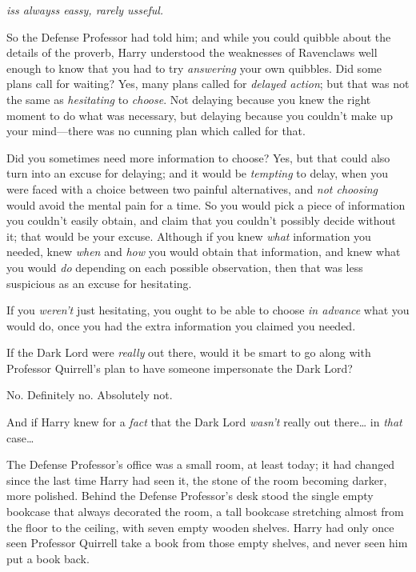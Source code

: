 
\emph{iss alwayss eassy, rarely usseful.}

\quad
So the Defense Professor had told him; and while you could quibble about the
details of the proverb, Harry understood the weaknesses of Ravenclaws well
enough to know that you had to try \emph{answering} your own quibbles. Did some
plans call for waiting? Yes, many plans called for \emph{delayed action}; but
that was not the same as \emph{hesitating} to \emph{choose}. Not delaying
because you knew the right moment to do what was necessary, but delaying
because you couldn't make up your mind---there was no cunning plan which called
for that.

Did you sometimes need more information to choose? Yes, but that could also
turn into an excuse for delaying; and it would be \emph{tempting} to delay,
when you were faced with a choice between two painful alternatives, and
\emph{not choosing} would avoid the mental pain for a time. So you would pick a
piece of information you couldn't easily obtain, and claim that you couldn't
possibly decide without it; that would be your excuse. Although if you knew
\emph{what} information you needed, knew \emph{when} and \emph{how} you would
obtain that information, and knew what you would \emph{do} depending on each
possible observation, then that was less suspicious as an excuse for hesitating.

If you \emph{weren't} just hesitating, you ought to be able to choose \emph{in
advance} what you would do, once you had the extra information you claimed you
needed.

If the Dark Lord were \emph{really} out there, would it be smart to go along
with Professor Quirrell's plan to have someone impersonate the Dark Lord?

No. Definitely no. Absolutely not.

And if Harry knew for a \emph{fact} that the Dark Lord \emph{wasn't} really out
there{\ldots} in \emph{that} case{\ldots}

The Defense Professor's office was a small room, at least today; it had changed
since the last time Harry had seen it, the stone of the room becoming darker,
more polished. Behind the Defense Professor's desk stood the single empty
bookcase that always decorated the room, a tall bookcase stretching almost from
the floor to the ceiling, with seven empty wooden shelves. Harry had only once
seen Professor Quirrell take a book from those empty shelves, and never seen
him put a book back.

